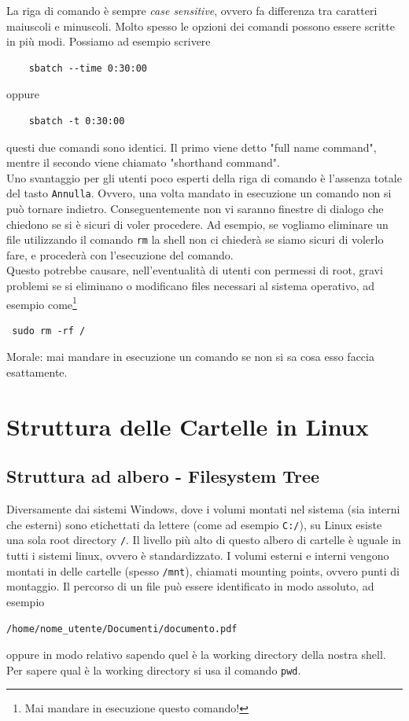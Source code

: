 La riga di comando è sempre \textit{case sensitive}, ovvero fa differenza tra caratteri maiuscoli e minuscoli. Molto spesso le opzioni dei comandi possono essere scritte in più modi. Possiamo ad esempio scrivere
\begin{verbatim}
	sbatch --time 0:30:00
\end{verbatim}
oppure 
\begin{verbatim}
	sbatch -t 0:30:00
\end{verbatim}
questi due comandi sono identici. Il primo viene detto "full name command", mentre il secondo viene chiamato "shorthand command".\\
Uno svantaggio per gli utenti poco esperti della riga di comando è l'assenza totale del tasto \verb"Annulla". Ovvero, una volta mandato in esecuzione un comando non si può tornare indietro. Conseguentemente non vi saranno finestre di dialogo che chiedono se si è sicuri di voler procedere. Ad esempio, se vogliamo eliminare un file utilizzando il comando \verb"rm" la shell non ci chiederà se siamo sicuri di volerlo fare, e procederà con l'esecuzione del comando.\\
Questo potrebbe causare, nell'eventualità di utenti con permessi di root, gravi problemi se si eliminano o modificano files necessari al sistema operativo, ad esempio come\footnote{Mai mandare in esecuzione questo comando!}
\begin{verbatim}
 sudo rm -rf /
\end{verbatim}
Morale: mai mandare in esecuzione un comando se non si sa cosa esso faccia esattamente. 

\chapter{Struttura delle Cartelle in Linux}
\section{Struttura ad albero - Filesystem Tree}
Diversamente dai sistemi Windows, dove i volumi montati nel sistema (sia interni che esterni) sono etichettati da lettere (come ad esempio \verb"C:/"), su Linux esiste una sola root directory \verb"/". Il livello più alto di questo albero di cartelle è uguale in tutti i sistemi linux, ovvero è standardizzato. I volumi esterni e interni vengono montati in delle cartelle (spesso \verb"/mnt"), chiamati mounting points, ovvero punti di montaggio. Il percorso di un file può essere identificato in modo assoluto, ad esempio 
\begin{verbatim}
/home/nome_utente/Documenti/documento.pdf
\end{verbatim}
oppure in modo relativo sapendo quel è la working directory della nostra shell. Per sapere qual è la working directory si usa il comando \verb"pwd".

